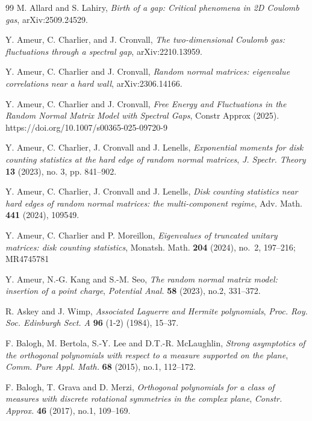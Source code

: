\documentclass[reqno]{amsart}
\newcommand{\1}{\mathds{1}}
\numberwithin{equation}{section}
\theoremstyle{definition}
\begin{document}
\begin{thebibliography}{99}
M. Allard and S. Lahiry,
\emph{Birth of a gap: Critical phenomena in 2D Coulomb gas},  arXiv:2509.24529.



 Y. Ameur, C. Charlier, and J. Cronvall, \emph{The two-dimensional Coulomb gas: fluctuations through a spectral gap}, arXiv:2210.13959.

 Y. Ameur, C. Charlier and J. Cronvall, \emph{Random normal matrices: eigenvalue correlations near a hard wall}, arXiv:2306.14166.

Y. Ameur, C. Charlier and J. Cronvall, \emph{Free Energy and Fluctuations in the Random Normal Matrix Model with Spectral Gaps}, Constr Approx (2025). https://doi.org/10.1007/s00365-025-09720-9


 Y. Ameur, C. Charlier, J. Cronvall and J. Lenells, \emph{Exponential moments for disk counting statistics at the hard edge of random normal matrices}, \textit{J. Spectr. Theory} \textbf{13} (2023), no. 3, pp. 841--902.



 Y. Ameur, C. Charlier, J. Cronvall and J. Lenells, \emph{Disk counting statistics near hard edges of random normal matrices: the multi-component regime}, Adv. Math. \textbf{441} (2024), 109549.

Y. Ameur, C. Charlier and P. Moreillon, \emph{Eigenvalues of truncated unitary matrices: disk counting statistics}, Monatsh. Math. {\bf 204} (2024), no.~2, 197--216; MR4745781

 Y. Ameur, N.-G. Kang and S.-M. Seo, \emph{The random normal matrix model: insertion of a point charge}, \textit{Potential Anal.} \textbf{58} (2023), no.2, 331--372.

 R. Askey and J. Wimp, \emph{Associated Laguerre and Hermite polynomials}, \textit{Proc. Roy. Soc. Edinburgh Sect. A} \textbf{96} (1-2) (1984), 15--37.


 F. Balogh, M. Bertola, S.-Y. Lee and D.T.-R. McLaughlin, \emph{Strong asymptotics of the orthogonal polynomials with respect to a measure supported on the plane}, \textit{Comm. Pure Appl. Math.} \textbf{68} (2015), no.1, 112--172.

 F. Balogh, T. Grava and D. Merzi, \emph{Orthogonal polynomials for a class of measures with discrete rotational symmetries in the complex plane}, \textit{Constr. Approx.} \textbf{46} (2017), no.1, 109--169.



\end{thebibliography}
\end{document}
